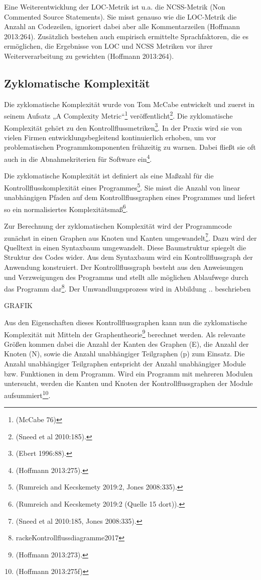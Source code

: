 Eine Weiterentwicklung der LOC-Metrik ist u.a. die NCSS-Metrik (Non
Commented Source Statements). Sie misst genauso wie die LOC-Metrik die
Anzahl an Codezeilen, ignoriert dabei aber alle Kommentarzeilen
(Hoffmann 2013:264). Zusätzlich bestehen auch empirisch ermittelte
Sprachfaktoren, die es ermöglichen, die Ergebnisse von LOC und NCSS
Metriken vor ihrer Weiterverarbeitung zu gewichten (Hoffmann 2013:264).

\subsection{Zyklomatische Komplexität}\label{Zyklomatische-Komplexitat}

Die zyklomatische Komplexität wurde von Tom McCabe entwickelt und zuerst
in seinem Aufsatz „A Complexity Metric``\footnote{(McCabe 76)}
veröffentlicht\footnote{(Sneed et al 2010:185).}. Die zyklomatische
Komplexität gehört zu den Kontrollflussmetriken\footnote{(Ebert
  1996:88).}. In der Praxis wird sie von vielen Firmen
entwicklungsbegleitend kontinuierlich erhoben, um vor problematischen
Programmkomponenten frühzeitig zu warnen. Dabei fließt sie oft auch in
die Abnahmekriterien für Software ein\footnote{(Hoffmann 2013:275).}.

Die zyklomatische Komplexität ist definiert als eine Maßzahl für die
Kontrollflusskomplexität eines Programmes\footnote{(Rumreich and
  Kecskemety 2019:2, Jones 2008:335).}. Sie misst die Anzahl von linear
unabhängigen Pfaden auf dem Kontrollflussgraphen eines Programmes und
liefert so ein normalisiertes Komplexitätsmaß\footnote{(Rumreich and
  Kecskemety 2019:2 (Quelle 15 dort)).}.

Zur Berechnung der zyklomatischen Komplexität wird der Programmcode
zunächst in einen Graphen aus Knoten und Kanten umgewandelt\footnote{(Sneed
  et al 2010:185, Jones 2008:335).}. Dazu wird der Quelltext in einen
Syntaxbaum umgewandelt. Diese Baumstruktur spiegelt die Struktur des
Codes wider. Aus dem Syntaxbaum wird ein Kontrollflussgraph der
Anwendung konstruiert. Der Kontrollflussgraph besteht aus den
Anweisungen und Verzweigungen des Programms und stellt alle möglichen
Ablaufwege durch das Programm dar\footnote{rackeKontrollflussdiagramme2017}.
Der Umwandlungsprozess wird in Abbildung .. beschrieben

GRAFIK

Aus den Eigenschaften dieses Kontrollflussgraphen kann nun die
zyklomatische Komplexität mit Mitteln der Graphentheorie\footnote{(Hoffmann
  2013:273).} berechnet werden. Als relevante Größen kommen dabei die
Anzahl der Kanten des Graphen (E), die Anzahl der Knoten (N), sowie die
Anzahl unabhängiger Teilgraphen (p) zum Einsatz. Die Anzahl unabhängiger
Teilgraphen entspricht der Anzahl unabhängiger Module bzw. Funktionen in
dem Programm. Wird ein Programm mit mehreren Modulen untersucht, werden
die Kanten und Knoten der Kontrollflussgraphen der Module
aufsummiert\footnote{(Hoffmann 2013:275f)}.

